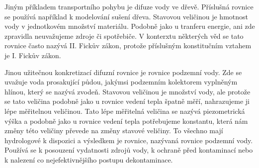 \documentclass[12pt]{article}
\begin{document}
Jiným příkladem transportního pohybu je difuze vody ve dřevě. Příslušná rovnice se používá například k modelování sušení dřeva. Stavovou veličinou je hmotnost vody v jednotkovém množství materiálu. Podobně jako u tranferu energie, ani zde zpravidla neuvažujeme zdroje či spotřebiče. V konterxtu některých věd se tato rovnice často nazývá II. Fickův zákon, protože příslušným konstitučním vztahem je I. Fickův zákon.

Jinou užitečnou konkretizací difuzní rovnice je rovnice podzemní vody. Zde se uvažuje voda prosakující půdou, jakýmsi podzemním kolektorem vyplněným hlínou, který se nazývá zvodeň. Stavovou veličinou je množství vody, ale protože se tato veličina podobně jako u rovnice vedení tepla špatně měří, nahrazujeme ji lépe měřitelnou veličinou. Tato lépe měřitelná veličina se nazývá piezometrická výška a podobně jako u rovnice vedení tepla potřebujeme konstantu, která nám změny této veličiny převede na změny stavové veličiny. To všechno mají hydrologové k dispozici a výsledkem je rovnice, nazývaná rovnice podzemní vody. Používá se k posouzení vydatnosti zdrojů vody, k ochraně před kontaminací nebo k nalezení co nejefektivnějšího postupu dekontaminace. 
\end{document}
